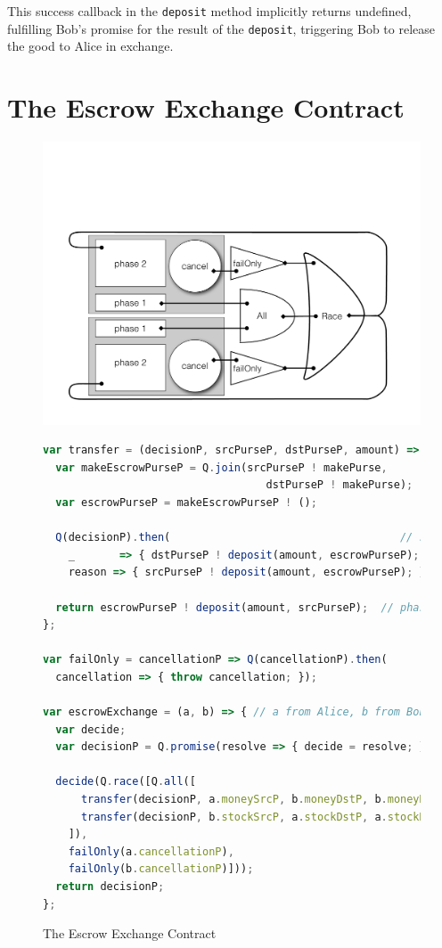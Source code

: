 \documentclass{llncs}
\begin{document}
This success callback in the {\tt deposit} method implicitly returns undefined, fulfilling Bob's promise for the result of the {\tt deposit}, triggering Bob to release the good to Alice in exchange.



\section{The Escrow Exchange Contract}

\begin{figure}[htbp]
\begin{center}
\includegraphics[scale=0.3]{cyclic-circuit.pdf}
\end{center}
\begin{lstlisting}[language=javascript]
var transfer = (decisionP, srcPurseP, dstPurseP, amount) => {
  var makeEscrowPurseP = Q.join(srcPurseP ! makePurse, 
                                   dstPurseP ! makePurse);
  var escrowPurseP = makeEscrowPurseP ! ();

  Q(decisionP).then(                                    // setup phase 2
    _       => { dstPurseP ! deposit(amount, escrowPurseP); },
    reason => { srcPurseP ! deposit(amount, escrowPurseP); });
    
  return escrowPurseP ! deposit(amount, srcPurseP);  // phase 1
};

var failOnly = cancellationP => Q(cancellationP).then(
  cancellation => { throw cancellation; });

var escrowExchange = (a, b) => { // a from Alice, b from Bob
  var decide;
  var decisionP = Q.promise(resolve => { decide = resolve; });

  decide(Q.race([Q.all([
      transfer(decisionP, a.moneySrcP, b.moneyDstP, b.moneyNeeded),
      transfer(decisionP, b.stockSrcP, a.stockDstP, a.stockNeeded)
    ]), 
    failOnly(a.cancellationP), 
    failOnly(b.cancellationP)]));
  return decisionP;
};
\end{lstlisting}
\caption{The Escrow Exchange Contract}
\label{escrowExchange}
\end{figure}
\end{document}
